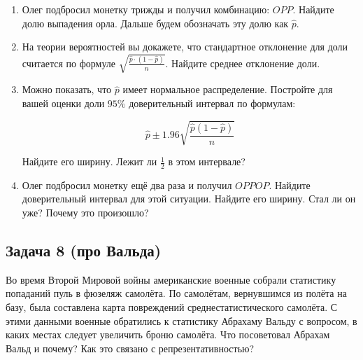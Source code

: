 \documentclass[12pt, a4paper, oneside]{article}
\begin{document}
\begin{enumerate}
	\item  Олег подбросил монетку трижды и получил комбинацию: $OPP$. Найдите долю выпадения орла.  Дальше будем обозначать эту долю как $\hat p$. 
	
	\item  На теории вероятностей вы докажете, что стандартное отклонение для доли считается по формуле $ \sqrt{\frac{\hat p \cdot (1 - \hat p)}{n}}.$ Найдите среднее отклонение доли. 
	
	\item Можно показать, что $\hat p$ имеет нормальное распределение. Постройте для вашей оценки доли $95\%$ доверительный интервал по формулам: 
	
	$$\hat{p}\pm 1.96 \sqrt{\frac{\hat{p}\left(1-\hat{p}\right)}{n}}$$
	
	Найдите его ширину.  Лежит ли $\frac{1}{2}$ в этом интервале? 
	
	\item Олег подбросил монетку ещё два раза и получил $OPPOP$. Найдите доверительный интервал для этой ситуации. Найдите его ширину. Стал ли он уже? Почему это произошло? 
\end{enumerate}


\subsection*{Задача  8 (про Вальда)} 

Во время Второй Мировой войны американские военные собрали статистику попаданий пуль в фюзеляж самолёта. По самолётам, вернувшимся из полёта на базу, была составлена карта повреждений среднестатистического самолёта. С этими данными военные обратились к статистику Абрахаму Вальду с вопросом, в каких местах следует увеличить броню самолёта. Что посоветовал Абрахам Вальд и почему? Как это связано с репрезентативностью? 

\end{document}

